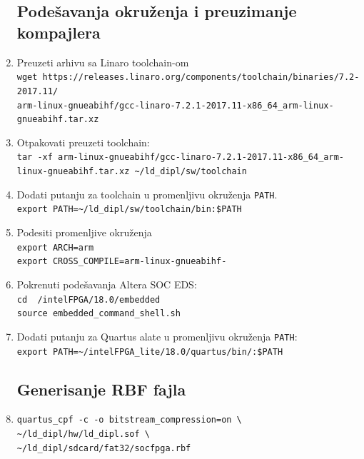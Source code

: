 \begin{enumerate}
\subsection{Podešavanja okruženja i preuzimanje kompajlera}
\item Preuzeti arhivu sa Linaro toolchain-om\\
\texttt{wget https://releases.linaro.org/components/toolchain/binaries/7.2-2017.11/\\arm-linux-gnueabihf/gcc-linaro-7.2.1-2017.11-x86\_64\_arm-linux-gnueabihf.tar.xz}
\item Otpakovati preuzeti toolchain:\\
\texttt{tar -xf arm-linux-gnueabihf/gcc-linaro-7.2.1-2017.11-x86\_64\_arm-linux-gnueabihf.tar.xz \textasciitilde/ld\_dipl/sw/toolchain}
\item Dodati putanju za toolchain u promenljivu okruženja \texttt{PATH}.\\
\texttt{export PATH=\textasciitilde/ld\_dipl/sw/toolchain/bin:\$PATH}
\item Podesiti promenljive okruženja\\
\texttt{export ARCH=arm}\\
\texttt{export CROSS\_COMPILE=arm-linux-gnueabihf-}\\
\item Pokrenuti podešavanja Altera SOC EDS:\\ 
\texttt{cd ~/intelFPGA/18.0/embedded}\\
\texttt{source embedded\_command\_shell.sh}
\item Dodati putanju za Quartus alate u promenljivu okruženja \texttt{PATH}:\\
\texttt{export PATH=\textasciitilde/intelFPGA\_lite/18.0/quartus/bin/:\$PATH}

\subsection{Generisanje RBF fajla}
\item \texttt{quartus\_cpf -c -o bitstream\_compression=on \textbackslash \\ \textasciitilde/ld\_dipl/hw/ld\_dipl.sof \textbackslash \\ \textasciitilde/ld\_dipl/sdcard/fat32/socfpga.rbf}

\end{enumerate}
